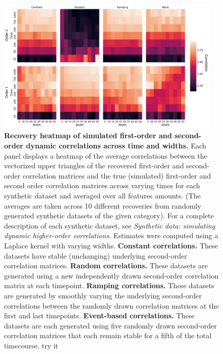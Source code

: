 \documentclass{article}
\begin{document}
\begin{figure}[p!]
\centering
\includegraphics[width=0.95\textwidth]{figs/sim_heatmaps_time}
  \caption{\textbf{Recovery heatmap of simulated first-order and
      second-order dynamic correlations across time and widths.}  Each panel displays a
    heatmap of the average correlations
    between the vectorized upper triangles of the recovered
    first-order and second-order correlation matrices and the true
    (simulated) first-order and second order correlation matrices
    across varying times for each synthetic dataset and averaged
    over all features amounts.  (The averages are taken
    across 10 different recoveries from
    randomly generated synthetic datasets of the given category).  For a complete description of each synthetic dataset,
    see \textit{Synthetic data: simulating dynamic higher-order
      correlations}.  Estimates were computed using a Laplace kernel
    with varying widths.  \textbf{ Constant correlations.}  These datasets
    have stable (unchanging) underlying second-order correlation
    matrices.  \textbf{Random correlations.} These datasets are
    generated using a new independently drawn second-order correlation
    matrix at each timepoint.  \textbf{Ramping correlations.}
    These datasets are generated by smoothly varying the underlying
    second-order correlations between the randomly drawn correlation
    matrices at the first and last timepoints.  \textbf{Event-based
      correlations.}  These datasets are each generated using five
    randomly drawn second-order correlation matrices that each remain
    stable for a fifth of the total timecourse. try it}
\label{fig:time}
\end{figure}
\end{document}
